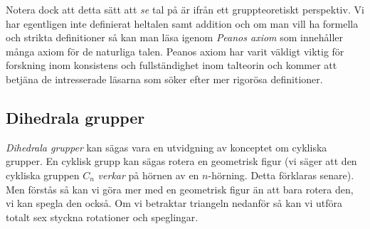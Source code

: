 \documentclass{article}
\theoremstyle{definition}
\begin{document}
Notera dock att detta sätt att \textit{se} tal på är ifrån ett gruppteoretiskt perspektiv. 
Vi har egentligen inte definierat heltalen samt addition och om man vill ha formella och strikta definitioner så kan man läsa igenom \textit{Peanos axiom} som 
innehåller många axiom för de naturliga talen. 
Peanos axiom har varit väldigt viktig 
för forskning inom konsistens och fullständighet inom talteorin och kommer att betjäna 
de intresserade läsarna som söker efter mer rigorösa definitioner.


\subsection{Dihedrala grupper}
\textit{Dihedrala grupper} kan sägas vara en utvidgning av konceptet om cykliska grupper. En cyklisk grupp kan sägas rotera 
en geometrisk figur (vi säger att den cykliska gruppen $C_n$ \textit{verkar} på hörnen av en $n$-hörning. Detta förklaras senare). Men förstås 
så kan vi göra mer med en geometrisk figur än att bara rotera den, vi kan spegla den också. Om vi betraktar triangeln nedanför så kan 
vi utföra totalt sex styckna rotationer och speglingar. 
\end{document}
